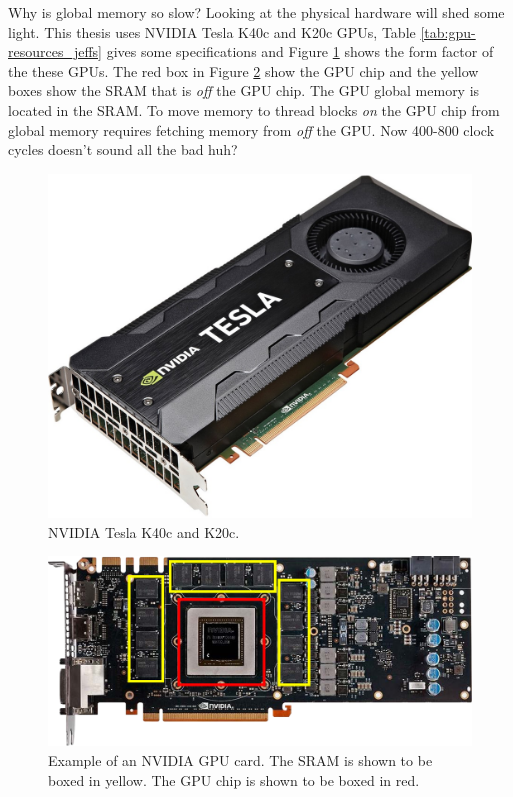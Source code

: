 Why is global memory so slow?
Looking at the physical hardware will shed some light.
This thesis uses NVIDIA Tesla K40c and K20c GPUs, Table \ref{tab:gpu-resources_jeffs} gives some specifications and Figure \ref{fig:GPUpicture} shows the form factor of the these GPUs.
The red box in Figure \ref{fig:GPUarch} show the GPU chip and the yellow boxes show the SRAM that is \textit{off} the GPU chip.
The GPU global memory is located in the SRAM.
To move memory to thread blocks \textit{on} the GPU chip from global memory requires fetching memory from \textit{off} the GPU.
Now 400-800 clock cycles doesn't sound all the bad huh?
\begin{figure}
	\centering\includegraphics[width=5in]{figures/gpu_intro/k40c_k20c.jpg}
	\caption{NVIDIA Tesla K40c and K20c.}
	\label{fig:GPUpicture}
\end{figure}
\begin{figure}
	\centering\includegraphics[width=\textwidth]{figures/gpu_intro/Kepler_box.png}
	\caption{Example of an NVIDIA GPU card. The SRAM is shown to be boxed in yellow. The GPU chip is shown to be boxed in red.}
	\label{fig:GPUarch}
\end{figure}
